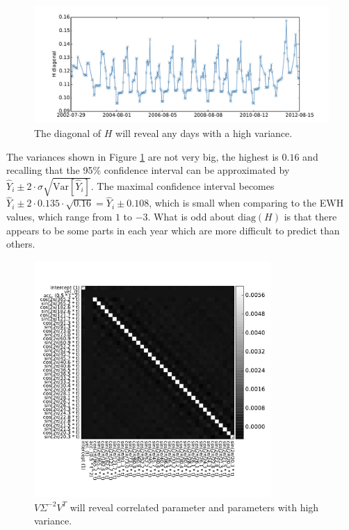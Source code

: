\begin{figure}[H]
	\centering
	\includegraphics[width=\textwidth]{figures/ols-world-diagnostics-diagH}
	\caption{The diagonal of $H$ will reveal any days with a high variance.}
	\label{fig:ols-world-performance-diagH}
\end{figure}

The variances shown in Figure \ref{fig:ols-world-performance-diagH} are not very big, the highest is $0.16$ and recalling that the 95\% confidence interval can be approximated by $\hat{Y}_i \pm 2 \cdot \hat{\sigma} \sqrt{\mathrm{Var}[\hat{Y}_i]}$. The maximal confidence interval becomes $\hat{Y}_i \pm 2 \cdot 0.135 \cdot \sqrt{0.16} = \hat{Y}_i \pm 0.108$, which is small when comparing to the EWH values, which range from $1$ to $-3$. What is odd about $\mathrm{diag}(H)$ is that there appears to be some parts in each year which are more difficult to predict than others. 

\begin{figure}[H]
	\centering
	\includegraphics[height=9cm]{figures/ols-world-diagnostics-cov}
	\caption{$V \Sigma^{-2} V^T$ will reveal correlated parameter and parameters with high variance.}
	\label{fig:ols-world-performance-cov}
\end{figure}

